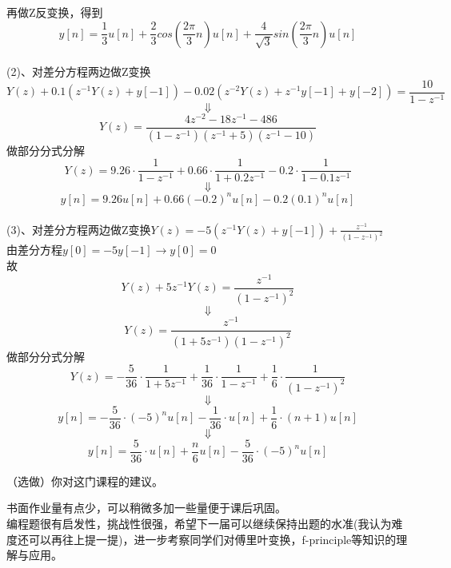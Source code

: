 \documentclass[answers]{exam}  %
\begin{document}
\begin{questions}
\begin{solution}
	再做Z反变换，得到
	$$y[n]=\frac{1}{3}u[n]+\frac{2}{3}cos(\frac{2\pi}{3}n)u[n]+\frac{4}{\sqrt{3}}sin(\frac{2\pi}{3}n)u[n]$$
	~\\
	(2)、对差分方程两边做Z变换\\
	$$Y(z)+0.1(z^{-1}Y(z)+y[-1])-0.02(z^{-2}Y(z)+z^{-1}y[-1]+y[-2])=\frac{10}{1-z^{-1}}$$
	$$\Downarrow$$
	$$Y(z)=\frac{4z^{-2}-18z^{-1}-486}{(1-z^{-1})(z^{-1}+5)(z^{-1}-10)}$$
	做部分分式分解
	$$Y(z)=9.26\cdot\frac{1}{1-z^{-1}}+0.66\cdot\frac{1}{1+0.2z^{-1}}-0.2\cdot\frac{1}{1-0.1z^{-1}}$$
	$$\Downarrow$$
	$$y[n]=9.26u[n]+0.66(-0.2)^nu[n]-0.2(0.1)^nu[n]$$
~\\
	(3)、对差分方程两边做Z变换$Y(z)=-5(z^{-1}Y(z)+y[-1])+\frac{z^{-1}}{(1-z^{-1})^2}$\\
	由差分方程$y[0]=-5y[-1]\rightarrow y[0]=0$\\
		故$$Y(z)+5z^{-1}Y(z)=\frac{z^{-1}}{(1-z^{-1})^2}$$
	$$\Downarrow$$
	$$Y(z)=\frac{z^{-1}}{(1+5z^{-1})(1-z^{-1})^2}$$
	做部分分式分解$$Y(z)=-\frac{5}{36}\cdot\frac{1}{1+5z^{-1}}+\frac{1}{36}\cdot\frac{1}{1-z^{-1}}+\frac{1}{6}\cdot\frac{1}{(1-z^{-1})^2}$$
	$$\Downarrow$$
	$$y[n]=-\frac{5}{36}\cdot(-5)^nu[n]-\frac{1}{36}\cdot u[n]+\frac{1}{6}\cdot(n+1)u[n]$$
	$$\Downarrow$$
	$$y[n]=\frac{5}{36}\cdot u[n]+\frac{n}{6}u[n]-\frac{5}{36}\cdot(-5)^nu[n]$$
\end{solution}
\newpage
\question （选做）你对这门课程的建议。
\begin{solution}
	书面作业量有点少，可以稍微多加一些量便于课后巩固。\\
	编程题很有启发性，挑战性很强，希望下一届可以继续保持出题的水准(我认为难度还可以再往上提一提)，进一步考察同学们对傅里叶变换，f-principle等知识的理解与应用。
\end{solution}


\end{questions}
\end{document}
